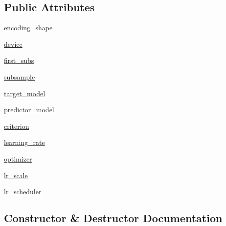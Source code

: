 \subsection*{Public Attributes}
\begin{DoxyCompactItemize}
\item 
\hyperlink{classtaxons_1_1core_1_1metrics_1_1rnd_1_1_r_n_d_a3b97dd30040fee58cb1b1e608b6b39cc}{encoding\+\_\+shape}
\item 
\hyperlink{classtaxons_1_1core_1_1metrics_1_1rnd_1_1_r_n_d_af45514f27a45279be100ce68d6310c58}{device}
\item 
\hyperlink{classtaxons_1_1core_1_1metrics_1_1rnd_1_1_r_n_d_a9b55ddb5dba5a5a040da82fe6e78a967}{first\+\_\+subs}
\item 
\hyperlink{classtaxons_1_1core_1_1metrics_1_1rnd_1_1_r_n_d_a27b64df9b0929bcef93aa706cc40c61e}{subsample}
\item 
\hyperlink{classtaxons_1_1core_1_1metrics_1_1rnd_1_1_r_n_d_ada7fd4f4dcc7fdf5b2cf606743cb7c41}{target\+\_\+model}
\item 
\hyperlink{classtaxons_1_1core_1_1metrics_1_1rnd_1_1_r_n_d_abf5a50bc9b3cc9100b6db6a7505fbabf}{predictor\+\_\+model}
\item 
\hyperlink{classtaxons_1_1core_1_1metrics_1_1rnd_1_1_r_n_d_ac24556936b90549984a5d600bc23b23d}{criterion}
\item 
\hyperlink{classtaxons_1_1core_1_1metrics_1_1rnd_1_1_r_n_d_a3da7ad05199283ef291f4109805a69ea}{learning\+\_\+rate}
\item 
\hyperlink{classtaxons_1_1core_1_1metrics_1_1rnd_1_1_r_n_d_a4bd22033db94f7ba4f47c34339f55662}{optimizer}
\item 
\hyperlink{classtaxons_1_1core_1_1metrics_1_1rnd_1_1_r_n_d_a7805647235ce8ca94c1b1a8c35dc96a9}{lr\+\_\+scale}
\item 
\hyperlink{classtaxons_1_1core_1_1metrics_1_1rnd_1_1_r_n_d_aead5af45b90c061b3e5700e8fe188848}{lr\+\_\+scheduler}
\end{DoxyCompactItemize}


\subsection{Constructor \& Destructor Documentation}
